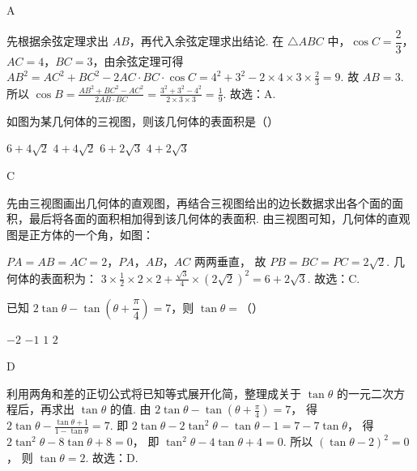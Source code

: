 \begin{answer}
A
\end{answer}

\begin{solution}
先根据余弦定理求出 \(AB\)，再代入余弦定理求出结论.
在 \(\triangle ABC\) 中，\(\cos C=\dfrac{2}{3}\)，\(AC=4\)，\(BC=3\)，由余弦定理可得
\(AB^2=AC^2+BC^2-2AC\cdot BC\cdot\cos C=4^2+3^2-2\times4\times3\times\frac{2}{3}=9\).
故 \(AB=3\).
所以
\(\cos B=\frac{AB^2+BC^2-AC^2}{2AB\cdot BC}=\frac{3^2+3^2-4^2}{2\times3\times3}=\frac{1}{9}\).
故选：A.
\end{solution}

\begin{problem}
如图为某几何体的三视图，则该几何体的表面积是（\quad）


\choices
    {\(6+4\sqrt{2}\)}
    {\(4+4\sqrt{2}\)}
    {\(6+2\sqrt{3}\)}
    {\(4+2\sqrt{3}\)}
\end{problem}

\begin{answer}
C
\end{answer}

\begin{solution}
先由三视图画出几何体的直观图，再结合三视图给出的边长数据求出各个面的面积，最后将各面的面积相加得到该几何体的表面积.
由三视图可知，几何体的直观图是正方体的一个角，如图：


\(PA=AB=AC=2\)，\(PA\)，\(AB\)，\(AC\) 两两垂直，
故 \(PB=BC=PC=2\sqrt{2}\).
几何体的表面积为：
\(3\times\frac{1}{2}\times2\times2+\frac{\sqrt{3}}{4}\times(2\sqrt{2})^2=6+2\sqrt{3}\).
故选：C.
\end{solution}

\begin{problem}
已知 \(2\tan\theta-\tan\left( \theta+\dfrac{\pi}{4} \right)=7\)，则 \(\tan\theta=\)（\quad）

\choices
    {\(-2\)}
    {\(-1\)}
    {\(1\)}
    {\(2\)}
\end{problem}

\begin{answer}
D
\end{answer}

\begin{solution}
利用两角和差的正切公式将已知等式展开化简，整理成关于 \(\tan\theta\) 的一元二次方程后，再求出 \(\tan\theta\) 的值.
由
\(2\tan\theta-\tan\left( \theta+\frac{\pi}{4} \right)=7\)，
得
\(2\tan\theta-\frac{\tan\theta+1}{1-\tan\theta}=7\).
即
\(2\tan\theta-2\tan^2\theta-\tan\theta-1=7-7\tan\theta\)，
得
\(2\tan^2\theta-8\tan\theta+8=0\)，
即
\(\tan^2\theta-4\tan\theta+4=0\).
所以
\((\tan\theta-2)^2=0\)，
则 \(\tan\theta=2\).
故选：D.
\end{solution}

